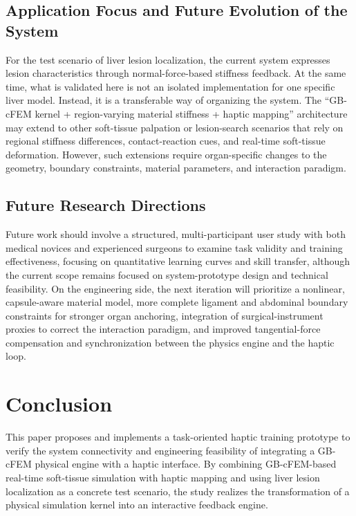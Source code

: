 \documentclass{ieeeaccess}
\begin{document}
\subsection{Application Focus and Future Evolution of the System}
For the test scenario of liver lesion localization, the current system expresses lesion characteristics through normal-force-based stiffness feedback. At the same time, what is validated here is not an isolated implementation for one specific liver model. Instead, it is a transferable way of organizing the system. The “GB-cFEM kernel + region-varying material stiffness + haptic mapping” architecture may extend to other soft-tissue palpation or lesion-search scenarios that rely on regional stiffness differences, contact-reaction cues, and real-time soft-tissue deformation. However, such extensions require organ-specific changes to the geometry, boundary constraints, material parameters, and interaction paradigm. \subsection{Future Research Directions}
Future work should involve a structured, multi-participant user study with both medical novices and experienced surgeons to examine task validity and training effectiveness, focusing on quantitative learning curves and skill transfer, although the current scope remains focused on system-prototype design and technical feasibility. On the engineering side, the next iteration will prioritize a nonlinear, capsule-aware material model, more complete ligament and abdominal boundary constraints for stronger organ anchoring, integration of surgical-instrument proxies to correct the interaction paradigm, and improved tangential-force compensation and synchronization between the physics engine and the haptic loop.

\section{Conclusion}
This paper proposes and implements a task-oriented haptic training prototype to verify the system connectivity and engineering feasibility of integrating a GB-cFEM physical engine with a haptic interface. By combining GB-cFEM-based real-time soft-tissue simulation with haptic mapping and using liver lesion localization as a concrete test scenario, the study realizes the transformation of a physical simulation kernel into an interactive feedback engine.
\end{document}
